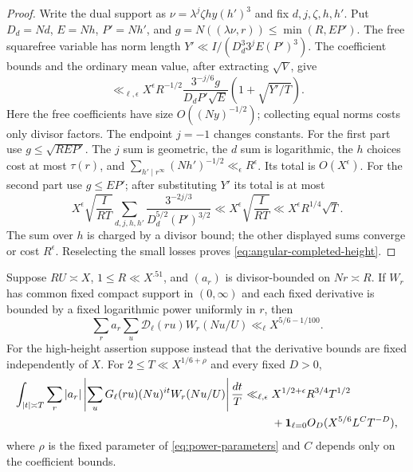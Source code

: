 \begin{proof}
Write the dual support as
$\nu=\lambda^j\zeta h y(h')^3$ and fix $d,j,\zeta,h,h'$.
Put $D_d=Nd$, $E=Nh$, $P'=Nh'$, and
$g=N((\lambda\nu,r))\le\min(R,EP')$.
The free squarefree variable has norm length
$Y'\ll I/(D_d^3 3^j E(P')^3)$.
The coefficient bounds and the ordinary mean value, after extracting
$\sqrt V$, give
\[
 \ll_{\ell,\epsilon}X^\epsilon R^{-1/2}
 \frac{3^{-j/6}g}{D_d P'\sqrt E}
       \left(1+\sqrt{Y'/T}\right).
\]
Here the free coefficients have size $O((Ny)^{-1/2})$;
collecting equal norms costs only divisor factors. The endpoint
$j=-1$ changes constants.
For the first part use $g\le\sqrt{REP'}$. The $j$ sum is
geometric, the $d$ sum is logarithmic, the $h$ choices cost at
most $\tau(r)$, and
$\sum_{h'\mid r^\infty}(Nh')^{-1/2}\ll_\epsilon R^\epsilon$.
Its total is $O(X^\epsilon)$.
For the second part use $g\le EP'$; after substituting $Y'$ its
total is at most
\[
 X^\epsilon\sqrt{\frac I{RT}}
 \sum_{d,j,h,h'}\frac{3^{-2j/3}}
                       {D_d^{5/2}(P')^{3/2}}
 \ll X^\epsilon\sqrt{\frac I{RT}}
 \ll X^\epsilon R^{1/4}\sqrt T.
\]
The sum over $h$ is charged by a divisor bound; the other displayed
sums converge or cost $R^\epsilon$. Reselecting the small losses
proves \eqref{eq:angular-completed-height}.

\end{proof}

\begin{proposition}
\label{prop:angular-typeI}
Suppose $RU\asymp X$, $1\le R\ll X^{.51}$, and $(a_r)$ is
divisor-bounded on $Nr\asymp R$. If $W_r$ has common fixed compact
support in $(0,\infty)$ and each fixed derivative is bounded by a
fixed logarithmic power uniformly in $r$, then
\begin{equation}
 \sum_r a_r\sum_u\mathcal D_\ell(ru)W_r(Nu/U)
       \ll_\ell X^{5/6-1/100}.
 \label{eq:angular-typeI-low}
\end{equation}
For the high-height assertion suppose instead that the derivative
bounds are fixed independently of $X$. For
$2\le T\ll X^{1/6+\rho}$ and every fixed $D>0$,
\begin{align}
 \int_{|t|\asymp T}\sum_r|a_r|
 \left|\sum_u G_\ell(ru)(Nu)^{it}W_r(Nu/U)\right|\frac{dt}T
 \ll_{\ell,\epsilon}{}&
       X^{1/2+\epsilon}R^{3/4}T^{1/2}\notag\\
 &+\boldsymbol1_{\ell=0}
       O_D(X^{5/6}L^C T^{-D}),
 \label{eq:angular-typeI-high}
\end{align}
where $\rho$ is the fixed parameter of \eqref{eq:power-parameters}
and $C$ depends only on the coefficient bounds.
\end{proposition}

